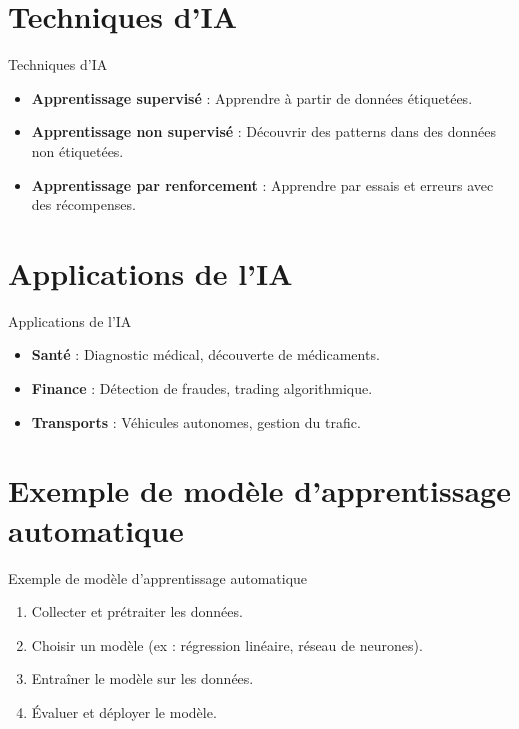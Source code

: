 \documentclass{clbeamer2024}
\begin{document}
	
	\section{Techniques d'IA}
	\begin{frame}{Techniques d'IA}
		\begin{itemize}
			\item \textbf{Apprentissage supervisé} : Apprendre à partir de données étiquetées.
			\item \textbf{Apprentissage non supervisé} : Découvrir des patterns dans des données non étiquetées.
			\item \textbf{Apprentissage par renforcement} : Apprendre par essais et erreurs avec des récompenses.
		\end{itemize}
	\end{frame}
	
	
	\section{Applications de l'IA}
	\begin{frame}{Applications de l'IA}
		\begin{itemize}
			\item \textbf{Santé} : Diagnostic médical, découverte de médicaments.
			\item \textbf{Finance} : Détection de fraudes, trading algorithmique.
			\item \textbf{Transports} : Véhicules autonomes, gestion du trafic.
		\end{itemize}
	\end{frame}
	
	
	\section{Exemple de modèle d'apprentissage automatique}
	\begin{frame}{Exemple de modèle d'apprentissage automatique}
		\begin{enumerate}
			\item Collecter et prétraiter les données.
		\item Choisir un modèle (ex : régression linéaire, réseau de neurones).
			\item Entraîner le modèle sur les données.
			\item Évaluer et déployer le modèle.
		\end{enumerate}
	\end{frame}
	
\end{document}

